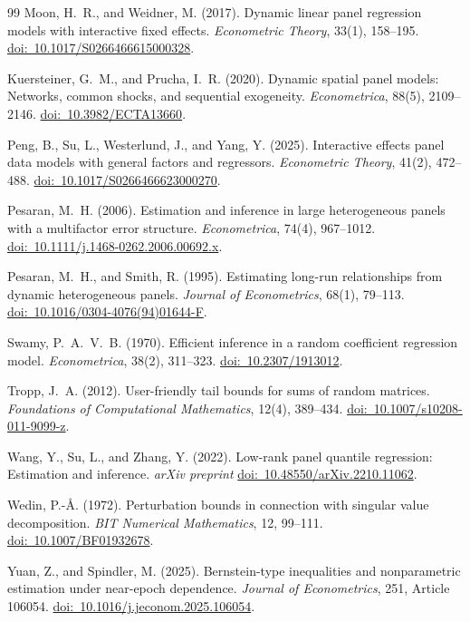 \documentclass[11pt]{article}
\numberwithin{equation}{section}
\theoremstyle{remark}
\newcommand{\doilink}[1]{\href{https://doi.org/#1}{doi:\ #1}}
\begin{document}
\begin{singlespace}
\begin{thebibliography}{99}
Moon, H.~R., and Weidner, M. (2017).
Dynamic linear panel regression models with interactive fixed effects.
\emph{Econometric Theory}, 33(1), 158--195.
\doilink{10.1017/S0266466615000328}.

Kuersteiner, G.~M., and Prucha, I.~R. (2020).
Dynamic spatial panel models: Networks, common shocks, and sequential exogeneity.
\emph{Econometrica}, 88(5), 2109--2146.
\doilink{10.3982/ECTA13660}.

Peng, B., Su, L., Westerlund, J., and Yang, Y. (2025).
Interactive effects panel data models with general factors and regressors.
\emph{Econometric Theory}, 41(2), 472--488.
\doilink{10.1017/S0266466623000270}.

Pesaran, M.~H. (2006).
Estimation and inference in large heterogeneous panels with a multifactor error structure.
\emph{Econometrica}, 74(4), 967--1012.
\doilink{10.1111/j.1468-0262.2006.00692.x}.

Pesaran, M.~H., and Smith, R. (1995).
Estimating long-run relationships from dynamic heterogeneous panels.
\emph{Journal of Econometrics}, 68(1), 79--113.
\doilink{10.1016/0304-4076(94)01644-F}.

Swamy, P.~A.~V.~B. (1970).
Efficient inference in a random coefficient regression model.
\emph{Econometrica}, 38(2), 311--323.
\doilink{10.2307/1913012}.

Tropp, J.~A. (2012).
User-friendly tail bounds for sums of random matrices.
\emph{Foundations of Computational Mathematics}, 12(4), 389--434.
\doilink{10.1007/s10208-011-9099-z}.

Wang, Y., Su, L., and Zhang, Y. (2022).
Low-rank panel quantile regression: Estimation and inference.
\emph{arXiv preprint} \doilink{10.48550/arXiv.2210.11062}.

Wedin, P.-\AA. (1972).
Perturbation bounds in connection with singular value decomposition.
\emph{BIT Numerical Mathematics}, 12, 99--111.
\doilink{10.1007/BF01932678}.

Yuan, Z., and Spindler, M. (2025).
Bernstein-type inequalities and nonparametric estimation under near-epoch dependence.
\emph{Journal of Econometrics}, 251, Article 106054.
\doilink{10.1016/j.jeconom.2025.106054}.

\end{thebibliography}
\end{singlespace}
\end{document}
